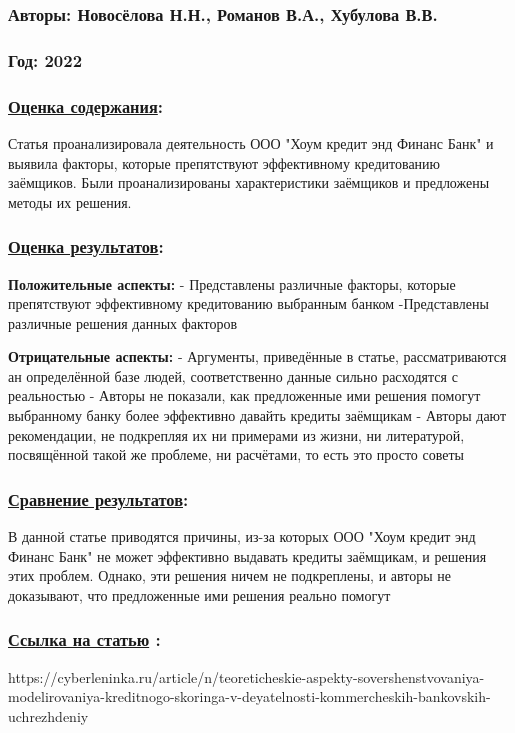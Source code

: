 \documentclass[a4paper,14pt]{article}
\begin{document}
\subsubsection*{Авторы: Новосёлова Н.Н., Романов В.А., Хубулова В.В.}
\subsubsection*{Год: 2022}
\subsubsection*{\underline{Оценка содержания}:}
Статья проанализировала деятельность ООО "Хоум кредит энд Финанс Банк" и выявила факторы, которые препятствуют эффективному кредитованию заёмщиков. Были проанализированы характеристики заёмщиков и предложены методы их решения. 
\subsubsection*{\underline{Оценка результатов}:}
\textbf{Положительные аспекты:} \newline
- Представлены различные факторы, которые препятствуют эффективному кредитованию выбранным банком \newline
-Представлены различные решения данных факторов\newline

\textbf{Отрицательные аспекты:} \newline
- Аргументы, приведённые в статье, рассматриваются ан определённой базе людей, соответственно данные сильно расходятся с реальностью \newline
- Авторы не показали, как предложенные ими решения помогут выбранному банку более эффективно давайть кредиты заёмщикам \newline
- Авторы дают рекомендации, не подкрепляя их ни примерами из жизни, ни литературой, посвящённой такой же проблеме, ни расчётами, то есть это просто советы
\subsubsection*{\underline{Сравнение результатов}:}
В данной статье приводятся причины, из-за которых ООО "Хоум кредит энд Финанс Банк" не может эффективно выдавать кредиты заёмщикам, и решения этих проблем. Однако, эти решения ничем не подкреплены, и авторы не доказывают, что предложенные ими решения реально помогут

\subsubsection*{\underline{Ссылка на статью} :}
https://cyberleninka.ru/article/n/teoreticheskie-aspekty-sovershenstvovaniya-modelirovaniya-kreditnogo-skoringa-v-deyatelnosti-kommercheskih-bankovskih-uchrezhdeniy
\end{document}
